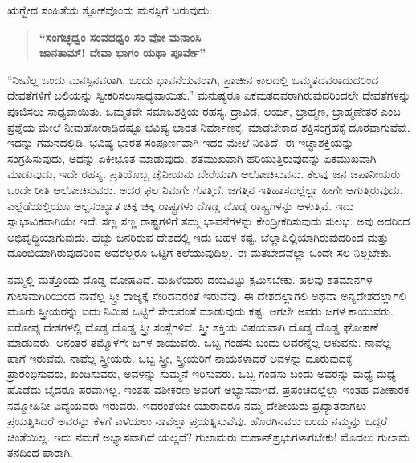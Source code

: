 \vskip -1pt

ಋಗ್ವೇದ ಸಂಹಿತೆಯ ಶ್ಲೋಕವೊಂದು ಮನಸ್ಸಿಗೆ ಬರುವುದು:

\vskip -4pt

\begin{verse}
\textbf{“ಸಂಗಚ್ಛಧ್ವಂ ಸಂವದಧ್ವಂ ಸಂ ವೋ ಮನಾಂಸಿ}\\\textbf{ಜಾನತಾಮ್​! ದೇವಾ ಭಾಗಂ ಯಥಾ ಪೂರ್ವೇ”}
\end{verse}

\vskip -4pt

“ನೀವೆಲ್ಲ ಒಂದು ಮನಸ್ಸಿನವರಾಗಿ, ಒಂದು ಭಾವನೆಯವರಾಗಿ, ಪ್ರಾಚೀನ ಕಾಲದಲ್ಲಿ ಒಮ್ಮತದವರಾದುದರಿಂದ ದೇವತೆಗಳಿಗೆ ಬಲಿಯನ್ನು ಸ್ವೀಕರಿಸಲು\break ಸಾಧ್ಯವಾಯಿತು.” ಮನುಷ್ಯರೂ ಏಕಮತದವರಾಗಿರುವುದರಿಂದಲೇ ದೇವತೆಗಳನ್ನು ಪೂಜಿಸಲು ಸಾಧ್ಯವಾಯಿತು. ಒಮ್ಮತವೇ ಸಮಾಜಶಕ್ತಿಯ ರಹಸ್ಯ. ದ್ರಾವಿಡ, ಆರ್ಯ, ಬ್ರಾಹ್ಮಣ, ಬ್ರಾಹ್ಮಣೇತರ ಎಂಬ ಪ್ರಶ್ನೆಯ ಮೇಲೆ ನೀವು\break ಹೋರಾಡಿದಷ್ಟೂ ಭವಿಷ್ಯ ಭಾರತ ನಿರ್ಮಾಣಕ್ಕೆ, ಮಾಡಬೇಕಾದ ಶಕ್ತಿ\break ಸಂಗ್ರಹಕ್ಕೆ ದೂರವಾಗುವೆವು. ಇದನ್ನು ಗಮನದಲ್ಲಿಡಿ. ಭವಿಷ್ಯ ಭಾರತ ಸಂಪೂರ್ಣವಾಗಿ ಇದರ ಮೇಲೆ ನಿಂತಿದೆ. ಈ ಇಚ್ಛಾಶಕ್ತಿಯನ್ನು ಸಂಗ್ರಹಿಸುವುದು, ಅದನ್ನು ಏಕೀಭೂತ ಮಾಡುವುದು, ಶತಮುಖವಾಗಿ ಹರಿಯುತ್ತಿರುವುದನ್ನು ಏಕಮುಖವಾಗಿ ಮಾಡುವುದು, ಇದೇ ರಹಸ್ಯ. ಪ್ರತಿಯೊಬ್ಬ ಚೈನೀಯನು ಬೇರೆಯಾಗಿ ಆಲೋಚಿಸುವನು. ಕೆಲವು ಜನ ಜಪಾನೀಯರು ಒಂದೇ ರೀತಿ ಆಲೋಚಿಸುವರು. ಅದರ ಫಲ ನಿಮಗೇ ಗೊತ್ತಿದೆ. ಜಗತ್ತಿನ ಇತಿಹಾಸದಲ್ಲೆಲ್ಲಾ ಹೀಗೇ ಆಗುತ್ತಿರುವುದು. ಎಲ್ಲೆಡೆಯಲ್ಲಿಯೂ ಅಲ್ಪಸಂಖ್ಯಾತ ಚಿಕ್ಕ ಚಿಕ್ಕ ರಾಷ್ಟ್ರಗಳು ದೊಡ್ಡ ದೊಡ್ಡ ರಾಷ್ಟ್ರಗಳನ್ನು ಆಳುತ್ತಿವೆ. ಇದು ಸ್ವಾಭಾವಿಕವಾಗಿಯೇ ಇದೆ. ಸಣ್ಣ ಸಣ್ಣ ರಾಷ್ಟ್ರಗಳಿಗೆ ತಮ್ಮ ಭಾವನೆಗಳನ್ನು ಕೇಂದ್ರೀ\-ಕರಿಸುವುದು ಸುಲಭ. ಅವು ಅದರಿಂದ ಅಭಿವೃದ್ಧಿಯಾಗುವುದು. ಹೆಚ್ಚು ಜನರಿರುವ ದೇಶದಲ್ಲಿ ಇದು ಬಹಳ ಕಷ್ಟ. ಚೆಲ್ಲಾಪಿಲ್ಲಿಯಾಗಿರುವುದರಿಂದ ಮತ್ತು ದೊಂಬಿಯಾಗಿರುವುದರಿಂದ ಅವರೆಲ್ಲರೂ ಒಟ್ಟಿಗೆ ಕಲೆಯುವುದಿಲ್ಲ. ಈ ಮತಭೇದವೆಲ್ಲಾ ಒಂದೇ ಸಲ ನಿಲ್ಲಬೇಕು.

\vskip -1pt

ನಮ್ಮಲ್ಲಿ ಮತ್ತೊಂದು ದೊಡ್ಡ ದೋಷವಿದೆ. ಮಹಿಳೆಯರು ದಯವಿಟ್ಟು ಕ್ಷಮಿಸಬೇಕು. ಹಲವು ಶತಮಾನಗಳ ಗುಲಾಮಗಿರಿಯಿಂದ ನಾವೆಲ್ಲ ಸ್ತ್ರೀ ರಾಜ್ಯಕ್ಕೆ ಸೇರಿದವರಂತೆ ಇರುವೆವು. ಈ ದೇಶದಲ್ಲಾಗಲಿ ಅಥವಾ ಅನ್ಯದೇಶದಲ್ಲಾಗಲಿ ಮೂರು ಸ್ತ್ರೀಯರನ್ನು ಐದು ನಿಮಿಷ ಒಟ್ಟಿಗೆ ಸೇರುವಂತೆ ಮಾಡುವುದು ಕಷ್ಟ. ಆಗಲೇ ಅವರು ಜಗಳ ಕಾಯುವರು. ಐರೋಪ್ಯ ದೇಶಗಳಲ್ಲಿ ದೊಡ್ಡ ದೊಡ್ಡ ಸ್ತ್ರೀ ಸಂಸ್ಥೆಗಳಿವೆ. ಸ್ತ್ರೀ ಶಕ್ತಿಯ ವಿಷಯವಾಗಿ ದೊಡ್ಡ ದೊಡ್ಡ ಘೋಷಣೆ ಮಾಡುವರು. ಅನಂತರ ತಮ್ಮೊಳಗೇ ಜಗಳ ಕಾಯುವರು. ಒಬ್ಬ ಗಂಡಸು ಬಂದು ಅವರನ್ನೆಲ್ಲ ಆಳುವನು. ನಾವೆಲ್ಲ ಹಾಗೆ ಇರುವೆವು. ನಾವೆಲ್ಲ ಸ್ತ್ರೀಯರು. ಒಬ್ಬ ಸ್ತ್ರೀ, ಸ್ತ್ರೀಯರಿಗೆ ನಾಯಕಳಾದರೆ ಅವಳನ್ನು ದೂರುವುದಕ್ಕೆ ಪ್ರಾರಂಭಿಸುವರು, ಖಂಡಿಸುವರು, ಅವಳನ್ನು ಸುಮ್ಮನೆ ಇರಿಸುವರು. ಒಬ್ಬ ಗಂಡಸು ಬಂದು ಅವರನ್ನು ಮಧ್ಯೆ ಮಧ್ಯೆ ಹೊಡೆದು ಬೈದರೂ ಪರವಾಗಿಲ್ಲ. ಇಂತಹ ವಶೀಕರಣ ಅವರಿಗೆ ಅಭ್ಯಾಸವಾಗಿದೆ. ಪ್ರಪಂಚದಲ್ಲೆಲ್ಲಾ ಇಂತಹ ವಶೀಕಾರಕ ಸಮ್ಮೋಹಿನೀ ವಿದ್ಯೆಯವರು ಇರುವರು. ಇದರಂತೆಯೇ ಯಾರಾದರೂ ನಮ್ಮ ದೇಶೀಯರು ಪ್ರಖ್ಯಾತರಾಗಲು ಪ್ರಯತ್ನಿಸಿದರೆ ಅವರನ್ನು ಕೆಳಗೆ ಎಳೆಯಲು ನಾವೆಲ್ಲಾ ಪ್ರಯತ್ನಿಸುವೆವು. ಹೊರಗಿನವರು ಬಂದು ನಮ್ಮನ್ನು ಒದ್ದರೆ ಚಿಂತೆಯಿಲ್ಲ. ಇದು ನಮಗೆ ಅಭ್ಯಾಸವಾಗಿದೆ ಯಲ್ಲವೆ? ಗುಲಾಮರು ಮಹಾನ್​ ಪ್ರಭುಗಳಾಗಬೇಕು! ಮೊದಲು ಗುಲಾಮ ತನದಿಂದ ಪಾರಾಗಿ.

